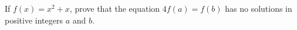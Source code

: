 If $f(x) = x^2 + x$,  prove that the equation $4f(a) = f(b)$ has no solutions in positive integers $a$ and $b$.